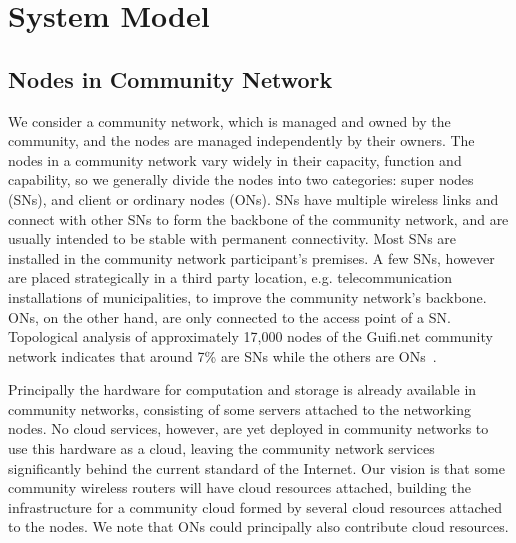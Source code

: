  
\section{System Model}
\label{sec__incentives_model}


\subsection{Nodes in Community Network}

We consider a community network, which is managed and owned by the community, and the nodes are managed independently by their owners. 
The nodes in a community network vary widely in their capacity, function and capability, 
so we generally divide the nodes into two categories: super nodes (SNs), and client or ordinary nodes (ONs).
SNs have multiple wireless links and connect with other SNs to form the backbone of the community network, 
and are usually intended to be stable with permanent connectivity.
Most SNs are installed in the community network participant's premises. 
A few SNs, however are placed strategically in a third party location, e.g. telecommunication installations of municipalities, to improve the community network's backbone.
ONs, on the other hand, are only connected to the access point of a SN. 
Topological analysis of approximately 17,000 nodes of the Guifi.net community network 
indicates that around 7\% are SNs while the others are ONs~\cite{Vega2012}.

Principally the hardware for computation and storage 
is already available in community networks, 
consisting of some servers attached to the networking nodes. 
No cloud services, however, are yet deployed in community networks to use this hardware as a cloud, leaving the community network services significantly behind the current standard of the Internet. 
Our vision is that some community wireless routers will have cloud resources attached, building the infrastructure for a community cloud formed by several cloud resources attached to the nodes.
We note that ONs could principally also contribute cloud resources.

